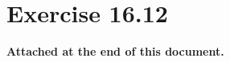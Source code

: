 \documentclass{article}
\begin{document}
\section{Exercise 16.12}
\textbf{Attached at the end of this document.}




\end{document}
